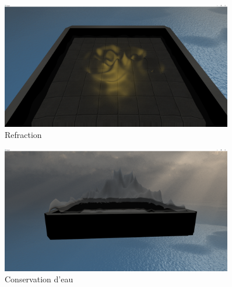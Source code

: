\documentclass[a4paper, 12pt]{article} %
\begin{document}
\begin{figure}
	\centering
	\includegraphics[width=0.9\textwidth]{./PhotoRapport/Refraction.png}
	\caption{Refraction}
	\label{Refractopm}
\end{figure}
\begin{figure}
	\centering
	\includegraphics[width=0.9\textwidth]{./PhotoRapport/WaterConservation.png}
	\caption{Conservation d'eau}
	\label{WaterConservation}
\end{figure}
\end{document}
